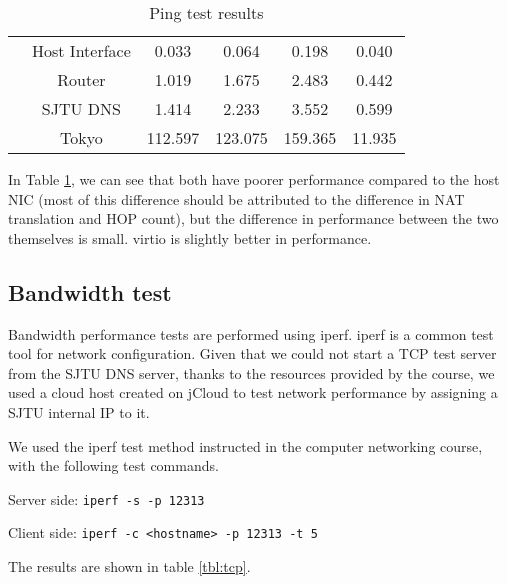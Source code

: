 \begin{table}[h]
\begin{tabular}{cc|cccc}
                        & Host Interface & 0.033            & 0.064            & 0.198            & 0.040          \\
                        & Router         & 1.019            & 1.675            & 2.483            & 0.442          \\
                        & SJTU DNS       & 1.414            & 2.233            & 3.552            & 0.599          \\
                        & Tokyo          & 112.597          & 123.075          & 159.365          & 11.935         \\ \hline
\end{tabular}
\caption{Ping test results}\label{tbl:ping}
\end{table}

In Table \ref{tbl:ping}, we can see that both have poorer performance compared to the host NIC (most of this difference should be attributed to the difference in NAT translation and HOP count), but the difference in performance between the two themselves is small. virtio is slightly better in performance.

\subsection{Bandwidth test}

Bandwidth performance tests are performed using iperf. iperf is a common test tool for network configuration. Given that we could not start a TCP test server from the SJTU DNS server, thanks to the resources provided by the course, we used a cloud host created on jCloud to test network performance by assigning a SJTU internal IP to it.

We used the iperf test method instructed in the computer networking course, with the following test commands.

Server side: \texttt{iperf -s -p 12313 }

Client side: \texttt{iperf -c <hostname> -p 12313 -t 5 }

The results are shown in table \ref{tbl:tcp}.

